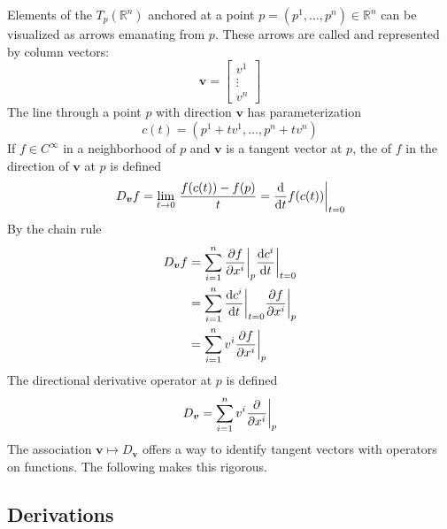 Elements of the  \(T_p (\mathbb{R}^n)\) anchored at a point \(p = (p^1, \dots, p^n) \in \mathbb{R}^n\) can be visualized as arrows emanating from \(p\).
%
These arrows are called  and represented by column vectors:
%
\begin{equation}
    \bm{v}
    =
    \begin{bmatrix}
        v^1 \\ \vdots \\ v^n
    \end{bmatrix}
\end{equation}
%
The line through a point \(p\) with direction \(\bm{v}\) has parameterization
%
\begin{equation}
    c(t) = \left( p^1 + t v^1, \dots, p^n + t v^n \right)
\end{equation}
%
If \(f \in C^\infty\) in a neighborhood of \(p\) and \(\bm{v}\) is a tangent vector at \(p\), the  of \(f\) in the direction of \(\bm{v}\) at \(p\) is defined
%
\begin{equation}
    D_{\bm{v}} f
    =
    \lim_{t\rightarrow 0}\, \frac{f(c(t)) - f(p)}{t}
    =
    \evalat[\bigg]{\dv{}{t} f(c(t))}{t=0}
\end{equation}
%
By the chain rule
%
\begin{align}
    D_{\bm{v}} f & = \sum_{i=1}^{n} \evalat[\bigg]{\pdv{f}{x^i}}{p} \evalat[\bigg]{\dv{c^i}{t}}{t=0} \\
                 & = \sum_{i=1}^{n} \evalat[\bigg]{\dv{c^i}{t}}{t=0} \evalat[\bigg]{\pdv{f}{x^i}}{p} \\
                 & = \sum_{i=1}^{n} v^i \evalat[\bigg]{\pdv{f}{x^i}}{p}\label{eqn:chainrule}         \\
\end{align}
%
The directional derivative operator at \(p\) is defined
%
\begin{equation}
    D_{\bm{v}} = \sum_{i=1}^{n} v^i \evalat[\bigg]{\pdv{}{x^i}}{p}
\end{equation}
%
The association \(\bm{v} \mapsto D_{\bm{v}}\) offers a way to  identify tangent vectors with operators on functions.
%
The following makes this rigorous.

\subsection{Derivations}

